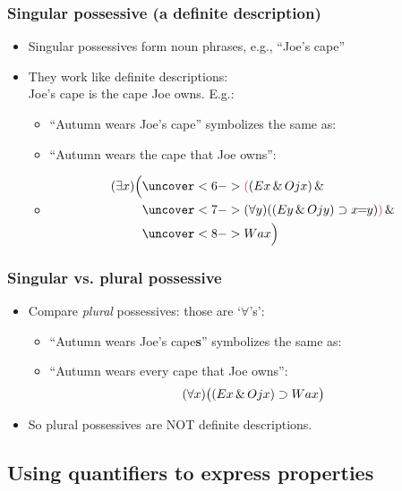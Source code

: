 \begin{frame}
  \frametitle{Singular possessive (a definite description)}

  \begin{itemize}[<+->]
    \item Singular possessives form noun phrases, e.g., ``Joe's cape''
    \item They work like definite descriptions: \\ Joe's cape is the cape Joe owns.
    E.g.:
    \begin{itemize}
      \item ``Autumn wears \alert{Joe's cape}'' symbolizes the same as:
      \item[] ``Autumn wears \alert{the cape that Joe owns}'':
      \item[]
      \begin{align*}
        \qt{\exists}{x}\Big(& \uncover<6->{\textcolor{OGlyallpink}{(}(E\qv{x} \land O\qr{j}{x}) \land {}}\\
        & \uncover<7->{\qt{\forall}{y}((E\qv{y} \land O\qr{j}{y}) \eif x\!\!=\!\!y)\textcolor{OGlyallpink}{)} \land {}}\\
        & \uncover<8->{W\qr{a}{x}\Big)}
      \end{align*}
    \end{itemize}
  \end{itemize}
\end{frame}

\begin{frame}
  \frametitle{Singular vs. plural possessive}

  \begin{itemize}[<+->]
    \item Compare \emph{plural} possessives: those are `$\forall$'s':
    \bigskip
    \begin{itemize}[<+->]
      \item ``Autumn wears \alert{Joe's cape\textbf{s}}'' symbolizes the same
      as:
      \item[] ``Autumn wears every cape that Joe owns'':
      \[(\forall x)\big((Ex \,\&\, Ojx) \supset Wax\big)\]
    \end{itemize}
    \item So plural possessives are NOT definite descriptions. 
  \end{itemize}
\end{frame}


\subsection{Using quantifiers to express properties}

